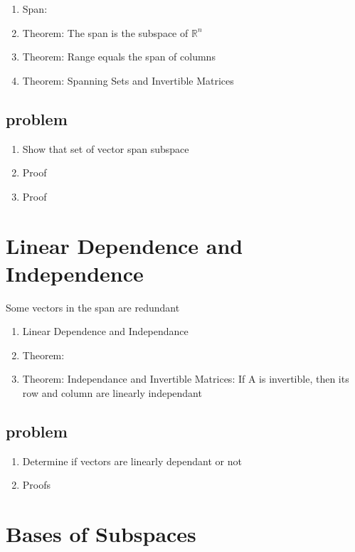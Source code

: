 \documentclass{article}
\begin{document}
\begin{enumerate}
    \item Span:
    \item Theorem: The span is the subspace of $\mathbb{R}^n$
    \item Theorem: Range equals the span of columns
    \item Theorem: Spanning Sets and Invertible Matrices
\end{enumerate}

\subsection{problem}
\begin{enumerate}
    \item Show that set of vector span subspace
    \item Proof
    \item Proof
\end{enumerate}

\section{Linear Dependence and Independence}

\begin{intuition}
    Some vectors in the span are redundant
\end{intuition}

\begin{enumerate}
    \item Linear Dependence and Independance
    \item Theorem:
    \item Theorem: Independance and Invertible Matrices: If A is invertible,
	then its row and column are linearly independant
\end{enumerate}

\subsection{problem}
\begin{enumerate}
    \item Determine if vectors are linearly dependant or not
    \item Proofs
\end{enumerate}

\section{Bases of Subspaces}
\end{document}
